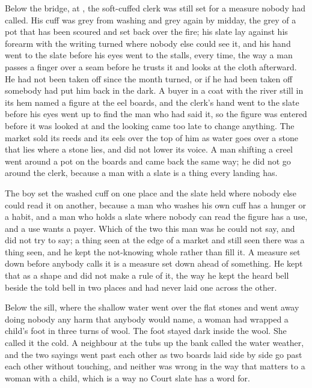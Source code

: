 Below the bridge, at , the soft-cuffed clerk was still set for a measure nobody had called. His cuff was grey from washing and grey again by midday, the grey of a pot that has been scoured and set back over the fire; his slate lay against his forearm with the writing turned where nobody else could see it, and his hand went to the slate before his eyes went to the stalls, every time, the way a man passes a finger over a seam before he trusts it and looks at the cloth afterward. He had not been taken off since the month turned, or if he had been taken off somebody had put him back in the dark. A buyer in a coat with the river still in its hem named a figure at the eel boards, and the clerk's hand went to the slate before his eyes went up to find the man who had said it, so the figure was entered before it was looked at and the looking came too late to change anything. The market sold its reeds and its eels over the top of him as water goes over a stone that lies where a stone lies, and did not lower its voice. A man shifting a creel went around a pot on the boards and came back the same way; he did not go around the clerk, because a man with a slate is a thing every landing has.

The boy set the washed cuff on one place and the slate held where nobody else could read it on another, because a man who washes his own cuff has a hunger or a habit, and a man who holds a slate where nobody can read the figure has a use, and a use wants a payer. Which of the two this man was he could not say, and did not try to say; a thing seen at the edge of a market and still seen there was a thing seen, and he kept the not-knowing whole rather than fill it. A measure set down before anybody calls it is a measure set down ahead of something. He kept that as a shape and did not make a rule of it, the way he kept the heard bell beside the told bell in two places and had never laid one across the other.

Below the sill, where the shallow water went over the flat stones and went away doing nobody any harm that anybody would name, a woman had wrapped a child's foot in three turns of wool. The foot stayed dark inside the wool. She called it the cold. A neighbour at the tubs up the bank called the water weather, and the two sayings went past each other as two boards laid side by side go past each other without touching, and neither was wrong in the way that matters to a woman with a child, which is a way no Court slate has a word for.

